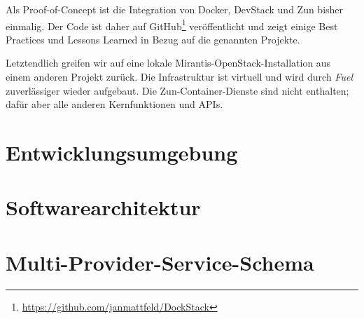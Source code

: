 Als Proof-of-Concept ist die Integration von Docker, DevStack und Zun bisher einmalig. Der Code ist daher auf GitHub\footnote{\url{https://github.com/janmattfeld/DockStack}} veröffentlicht und zeigt einige Best Practices und Lessons Learned in Bezug auf die genannten Projekte.

Letztendlich greifen wir auf eine lokale Mirantis-OpenStack-Installation aus einem anderen Projekt zurück. Die Infrastruktur ist virtuell und wird durch \emph{Fuel} zuverlässiger wieder aufgebaut. Die Zun-Container-Dienste sind nicht enthalten; dafür aber alle anderen Kernfunktionen und APIs.

\section{Entwicklungsumgebung}




\section{Softwarearchitektur}

%


\section{Multi-Provider-Service-Schema}

